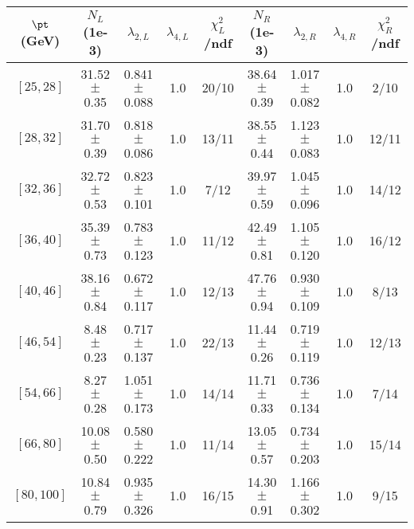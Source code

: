 \begin{tabular}{c||c|c|c|c||c|c|c|c}
$\pt$ (GeV) & $N_L$ (1e-3) & $\lambda_{2,L}$ & $\lambda_{4,L}$  & $\chi^2_L$/ndf & $N_R$ (1e-3) & $\lambda_{2,R}$ & $\lambda_{4,R}$  & $\chi^2_R$/ndf \\
\hline
$[25, 28]$ & 31.52$\pm$0.35 & 0.841$\pm$0.088 & 1.0 & 20/10 & 38.64$\pm$0.39 & 1.017$\pm$0.082 & 1.0 & 2/10\\
$[28, 32]$ & 31.70$\pm$0.39 & 0.818$\pm$0.086 & 1.0 & 13/11 & 38.55$\pm$0.44 & 1.123$\pm$0.083 & 1.0 & 12/11\\
$[32, 36]$ & 32.72$\pm$0.53 & 0.823$\pm$0.101 & 1.0 & 7/12 & 39.97$\pm$0.59 & 1.045$\pm$0.096 & 1.0 & 14/12\\
$[36, 40]$ & 35.39$\pm$0.73 & 0.783$\pm$0.123 & 1.0 & 11/12 & 42.49$\pm$0.81 & 1.105$\pm$0.120 & 1.0 & 16/12\\
$[40, 46]$ & 38.16$\pm$0.84 & 0.672$\pm$0.117 & 1.0 & 12/13 & 47.76$\pm$0.94 & 0.930$\pm$0.109 & 1.0 & 8/13\\
$[46, 54]$ & 8.48$\pm$0.23 & 0.717$\pm$0.137 & 1.0 & 22/13 & 11.44$\pm$0.26 & 0.719$\pm$0.119 & 1.0 & 12/13\\
$[54, 66]$ & 8.27$\pm$0.28 & 1.051$\pm$0.173 & 1.0 & 14/14 & 11.71$\pm$0.33 & 0.736$\pm$0.134 & 1.0 & 7/14\\
$[66, 80]$ & 10.08$\pm$0.50 & 0.580$\pm$0.222 & 1.0 & 11/14 & 13.05$\pm$0.57 & 0.734$\pm$0.203 & 1.0 & 15/14\\
$[80, 100]$ & 10.84$\pm$0.79 & 0.935$\pm$0.326 & 1.0 & 16/15 & 14.30$\pm$0.91 & 1.166$\pm$0.302 & 1.0 & 9/15\\
\end{tabular}
